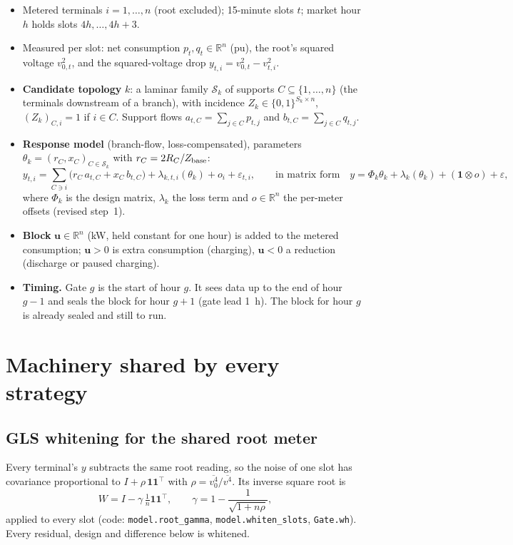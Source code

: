 \documentclass[11pt]{article}
\theoremstyle{definition}
\newcommand{\R}{\mathbb{R}}
\newcommand{\tp}{^{\top}}
\newcommand{\one}{\mathbf{1}}
\newcommand{\bu}{\bm{u}}
\newcommand{\code}[1]{\texttt{#1}}
\begin{document}
{\begin{itemize}
  \item Metered terminals $i=1,\dots,n$ (root excluded); 15-minute slots $t$; market hour $h$ holds slots $4h,\dots,4h+3$.
  \item Measured per slot: net consumption $p_t,q_t\in\R^{n}$ (pu), the root's squared voltage $v_{0,t}^2$, and the squared-voltage drop
        $y_{t,i}=v_{0,t}^2-v_{t,i}^2$.
  \item \textbf{Candidate topology} $k$: a laminar family $\mathcal S_k$ of supports $C\subseteq\{1,\dots,n\}$ (the terminals downstream of a branch), with incidence $Z_k\in\{0,1\}^{S_k\times n}$, $(Z_k)_{C,i}=1$ if $i\in C$. Support flows $a_{t,C}=\sum_{j\in C}p_{t,j}$ and $b_{t,C}=\sum_{j\in C}q_{t,j}$.
  \item \textbf{Response model} (branch-flow, loss-compensated), parameters $\theta_k=(r_C,x_C)_{C\in\mathcal S_k}$ with $r_C=2R_C/Z_{\rm base}$:
  \begin{equation}\label{eq:model}
    y_{t,i}=\sum_{C\ni i}\big(r_C\,a_{t,C}+x_C\,b_{t,C}\big)+\lambda_{k,t,i}(\theta_k)+o_i+\varepsilon_{t,i},
    \qquad\text{in matrix form}\quad y=\Phi_k\theta_k+\lambda_k(\theta_k)+(\one\otimes o)+\varepsilon ,
  \end{equation}
  where $\Phi_k$ is the design matrix, $\lambda_k$ the loss term and $o\in\R^n$ the per-meter offsets (revised step~1).
  \item \textbf{Block} $\bu\in\R^{n}$ (kW, held constant for one hour) is added to the metered consumption; $\bu>0$ is extra consumption (charging), $\bu<0$ a reduction (discharge or paused charging).
  \item \textbf{Timing.} Gate $g$ is the start of hour $g$. It sees data up to the end of hour $g-1$ and seals the block for hour $g+1$ (gate lead 1~h). The block for hour $g$ is already sealed and still to run.
\end{itemize}

\section{Machinery shared by every strategy}\label{sec:common}

\subsection{GLS whitening for the shared root meter}
Every terminal's $y$ subtracts the same root reading, so the noise of one slot has covariance proportional to $I+\rho\,\one\one\tp$ with $\rho=\overline{v_0^4}/\overline{v^4}$. Its inverse square root is
\begin{equation}\label{eq:gls}
  W=I-\gamma\,\tfrac{1}{n}\one\one\tp,\qquad \gamma=1-\frac{1}{\sqrt{1+n\rho}},
\end{equation}
applied to every slot (code: \code{model.root\_gamma}, \code{model.whiten\_slots}, \code{Gate.wh}). Every residual, design and difference below is whitened.

}
\end{document}
